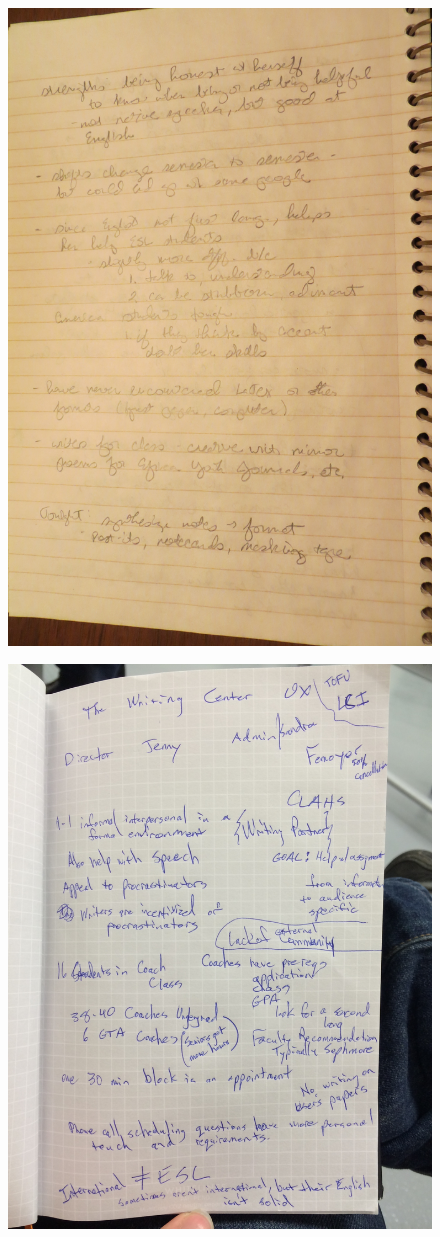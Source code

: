 \documentclass[12pt]{article} %
\begin{document}
  \begin{figure}[H]
  \centering
  \includegraphics[width=0.75\linewidth]{RAZ_raw_notes11}
  \caption{}
  \label{fig:rn11}
  \end{figure}
  \begin{figure}[H]
  \centering
  \includegraphics[width=0.75\linewidth]{special-raw-notes}
  \caption{}
  \label{fig:rn12}
  \end{figure}
\end{document}
